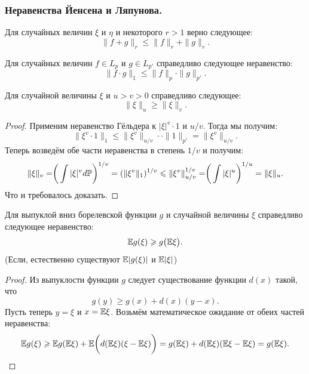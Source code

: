 \subsubsection{Неравенства Йенсена и Ляпунова.}
\begin{theorem}
    Для случайных величин $\xi$ и $\eta$ и некоторого $r > 1$ верно следующее:
    \[
        \|f + g\|_{r} \leq \|f\|_{r} + \|g\|_{r}.
    \]
\end{theorem}
\begin{theorem}
    Для случайных величин $f \in L_p$ и $g \in L_{p'}$ справедливо следующее неравенство:
    \[
        \|f \cdot g\|_{1} \leq \|f\|_{p} \cdot \|g\|_{p'}.
    \]
\end{theorem}
\begin{theorem}
    Для случайной величины $\xi$ и $u > v > 0$ справедливо следующее:
    \[
        \|\xi\|_{u} \geq \|\xi\|_{v}.
    \]
\end{theorem}
\begin{proof}
    Применим неравенство Гёльдера к $|\xi|^v \cdot 1$ и $u/v$. Тогда мы получим:
    \[
        \|\xi^v \cdot 1\|_1 \leq \|\xi^v\|_{u/v} \cdot  \cdot \|1\|_{p'} = \|\xi^v\|_{u/v}.
    \]
    Теперь возведём обе части неравенства в степень $1/v$ и получим:
    \[
        \|\xi\|_v = \biggr(\int |\xi|^v d\P\biggr)^{1/v} = (\|\xi^v\|_1)^{1/v} \leq \|\xi^v\|_{u/v}^{1/v} = \biggr(\int |\xi|^{u}\biggr)^{1/u} = \|\xi\|_u.
    \]
    Что и требовалось доказать.
\end{proof}
\begin{theorem}
    Для выпуклой вниз борелевской функции $g$ и случайной величины $\xi$ справедливо следующее неравенство:
    \[
        \Ex g(\xi) \geq g\bigr(\Ex \xi \bigr).
    \]
    (Если, естественно существуют $\Ex|g(\xi)|$ и $\Ex|\xi|$)
\end{theorem}
\begin{proof}
    Из выпуклости функции $g$ следует существование функции $d(x)$ такой, что
    \[
        g(y) \geq g(x) + d(x)(y - x).
    \]
    Пусть теперь $y = \xi$ и $x = \Ex \xi$. Возьмём математическое ожидание от обеих частей неравенства:
    \[
        \Ex g(\xi) \geq \Ex g(\Ex \xi) + \Ex \biggr( d(\Ex \xi)(\xi - \Ex \xi) \biggr) = g(\Ex \xi) + d(\Ex \xi) (\Ex \xi - \Ex \xi) = g(\Ex \xi).
    \]
\end{proof}
